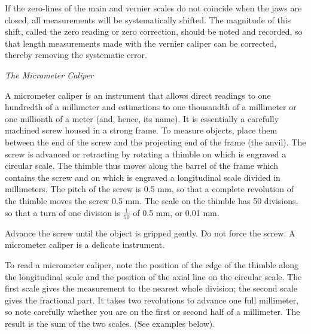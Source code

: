 If the zero-lines of the main and vernier scales do not coincide when the jaws are closed, all measurements will be systematically shifted. The magnitude of this shift, called the zero reading or zero correction, should be noted and recorded, so that length measurements made with the vernier caliper can be corrected, thereby removing the systematic error.

\textit{The Micrometer Caliper}

A micrometer caliper is an instrument that allows direct readings to one hundredth of a millimeter and estimations to one thousandth of a millimeter or one millionth of a meter (and, hence, its name). It is essentially a carefully machined screw housed in a strong frame. To measure objects, place them between the end of the screw and the projecting end of the frame (the anvil). The screw is advanced or retracting by rotating a thimble on which is engraved a circular scale. The thimble thus moves along the barrel of the frame which contains the screw and on which is engraved a longitudinal scale divided in millimeters. The pitch of the screw is 0.5 mm, so that a complete revolution of the thimble moves the screw 0.5 mm. The scale on the thimble has 50 divisions, so that a turn of one division is $\frac{1}{50}$ of 0.5 mm, or 0.01 mm.

Advance the screw until the object is gripped gently. Do not force the screw. A micrometer caliper is a delicate instrument.

To read a micrometer caliper, note the position of the edge of the thimble along the longitudinal scale and the position of the axial line on the circular scale. The first scale gives the measurement to the nearest whole division; the second scale gives the fractional part. It takes two revolutions to advance one full millimeter, so note carefully whether you are on the first or second half of a millimeter. The result is the sum of the two scales. (See examples below).

